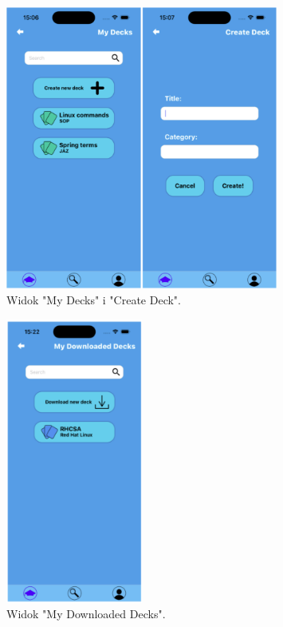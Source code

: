 \begin{figure}[H]
    \centering
    \includegraphics[width=0.8\textwidth]{chapters/chapter_10/images_mobile/mobile_my_decks}
    \caption{Widok "My Decks" i "Create Deck".}
    \label{img:mobile_my_decks}
\end{figure}


\begin{figure}[H]
    \centering
    \includegraphics[width=0.4\textwidth]{chapters/chapter_10/images_mobile/mobile_my_decks_2}
    \caption{Widok "My Downloaded Decks".}
    \label{img:mobile_my_decks_2}
\end{figure}


